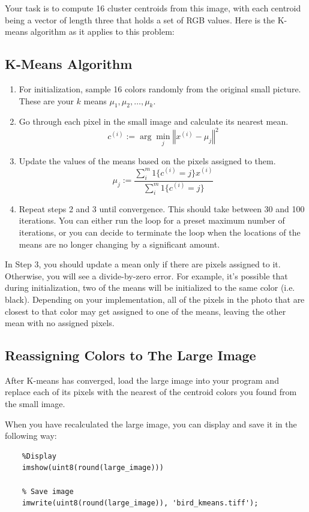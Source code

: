 \documentclass[10pt,a4paper]{article}
\begin{document}
  Your task is to compute 16 cluster centroids from this image, with each centroid being a vector of length three that holds a set of RGB values. Here is the K-means algorithm as it applies to this problem:




  \subsection{K-Means Algorithm}
  \begin{enumerate}
    \item For initialization, sample 16 colors randomly from the original small picture. These are your $k$ means  $\mu_1, \mu_2, \ldots , \mu_k$.
    \item Go through each pixel in the small image and calculate its nearest mean. 
      \begin{displaymath}
        c^{(i)} := \arg\min_{j}\left\Vert x^{(i)}-\mu_{j}\right\Vert ^{2}
      \end{displaymath}
    \item Update the values of the means based on the pixels assigned to them. 
      \begin{displaymath}
        \mu_{j}:=\frac{\sum_{i}^{m}1\{c^{(i)}=j\}x^{(i)}}{\sum_{i}^{m}1\{c^{(i)}=j\}}
      \end{displaymath}
    \item Repeat steps 2 and 3 until convergence. This should take between 30 and 100 iterations. You can either run the loop for a preset maximum number of iterations, or you can decide to terminate the loop when the locations of the means are no longer changing by a significant amount.
  \end{enumerate}


  In Step 3, you should update a mean only if there are pixels assigned to it. Otherwise, you will see a divide-by-zero error. For example, it's possible that during initialization, two of the means will be initialized to the same color (i.e. black). Depending on your implementation, all of the pixels in the photo that are closest to that color may get assigned to one of the means, leaving the other mean with no assigned pixels.




  \subsection{Reassigning Colors to The Large Image}
  After K-means has converged, load the large image into your program and replace each of its pixels with the nearest of the centroid colors you found from the small image.

  When you have recalculated the large image, you can display and save it in the following way:
  \begin{lstlisting}
    %Display
    imshow(uint8(round(large_image)))

    % Save image
    imwrite(uint8(round(large_image)), 'bird_kmeans.tiff');
  \end{lstlisting}
\end{document}
